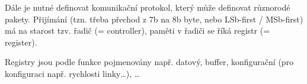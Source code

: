 \documentclass[12pt]{article}					%
\begin{document}
        \begin{definice}[Řadič]
            Dále je nutné definovat komunikační protokol, který může definovat různorodé pakety. Přijímání (tzn. třeba přechod z 7b na 8b byte, nebo LSb-first / MSb-first) má na starost tzv. řadič (= controller), paměti v řadiči se říká registr (= register).

            Registry jsou podle funkce pojmenovány např. datový, buffer, konfigurační (pro konfiguraci např. rychlosti linky…), …
        \end{definice}
\end{document}
